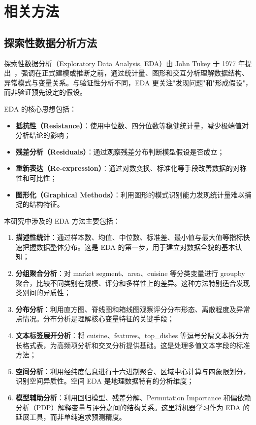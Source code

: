 \documentclass[11pt,a4paper]{article}
\begin{document}
\section{相关方法}

\subsection{探索性数据分析方法}

探索性数据分析（Exploratory Data Analysis, EDA）由 John Tukey 于 1977 年提出~\cite{tukey}，强调在正式建模或推断之前，通过统计量、图形和交互分析理解数据结构、异常模式与变量关系。与验证性分析不同，EDA 更关注"发现问题"和"形成假设"，而非验证预先设定的假设。

EDA 的核心思想包括：
\begin{itemize}[leftmargin=2em]
    \item \textbf{抵抗性（Resistance）}：使用中位数、四分位数等稳健统计量，减少极端值对分析结论的影响；
    \item \textbf{残差分析（Residuals）}：通过观察残差分布判断模型假设是否成立；
    \item \textbf{重新表达（Re-expression）}：通过对数变换、标准化等手段改善数据的对称性和可比性；
    \item \textbf{图形化（Graphical Methods）}：利用图形的模式识别能力发现统计量难以捕捉的结构特征。
\end{itemize}

本研究中涉及的 EDA 方法主要包括：

\begin{enumerate}[leftmargin=2em]
    \item \textbf{描述性统计}：通过样本数、均值、中位数、标准差、最小值与最大值等指标快速把握数据整体分布。这是 EDA 的第一步，用于建立对数据全貌的基本认知；

    \item \textbf{分组聚合分析}：对 market segment、area、cuisine 等分类变量进行 groupby 聚合，比较不同类别在规模、评分和多样性上的差异。这种方法特别适合发现类别间的异质性；

    \item \textbf{分布分析}：利用直方图、脊线图和箱线图观察评分分布形态、离散程度及异常点情况。分布分析是理解核心变量特征的关键手段；

    \item \textbf{文本标签展开分析}：将 cuisine、features、top\_dishes 等逗号分隔文本拆分为长格式表，为高频项分析和交叉分析提供基础。这是处理多值文本字段的标准方法；

    \item \textbf{空间分析}：利用经纬度信息进行十六进制聚合、区域中心计算与四象限划分，识别空间异质性。空间 EDA 是地理数据特有的分析维度；

    \item \textbf{模型辅助分析}：利用回归模型、残差分解、Permutation Importance 和偏依赖分析（PDP）解释变量与评分之间的结构关系。这里将机器学习作为 EDA 的延展工具，而非单纯追求预测精度。
\end{enumerate}
\end{document}
